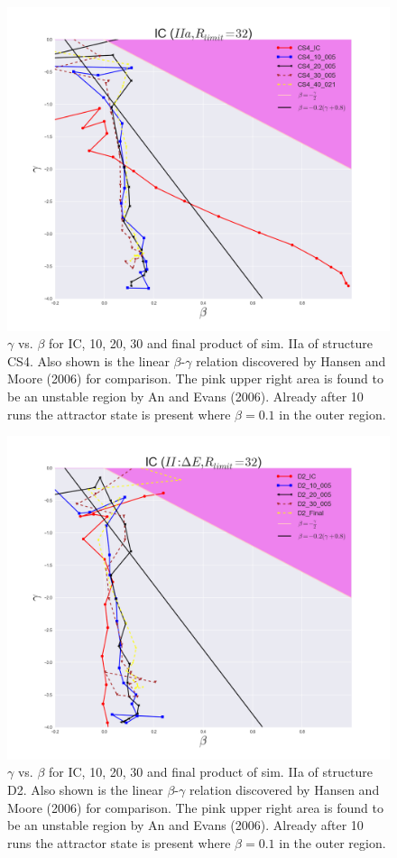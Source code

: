 \begin{figure}[!htbp]
\centering
\includegraphics[width=1.0\linewidth]{img/beta_vs_gamma_CS4_Time_evolution_Rlimit32_IIa.png}
\caption{$\gamma$ vs. $\beta$ for IC, 10, 20, 30 and final product of sim. IIa of structure CS4. Also shown is the linear $\beta$-$\gamma$ relation discovered by Hansen and Moore (2006) for comparison. The pink upper right area is found to be an unstable region by An and Evans (2006).
Already after 10 runs the attractor state is present where $\beta = 0.1$ in the outer region.}
\label{fig:test}
\end{figure}

\begin{figure}[!htbp]
\centering
\includegraphics[width=1.0\linewidth]{img/beta_vs_gamma_D2_Time_evolution_Rlimit32.png}
\caption{$\gamma$ vs. $\beta$ for IC, 10, 20, 30 and final product of sim. IIa of structure D2. Also shown is the linear $\beta$-$\gamma$ relation discovered by Hansen and Moore (2006) for comparison. The pink upper right area is found to be an unstable region by An and Evans (2006).
Already after 10 runs the attractor state is present where $\beta = 0.1$ in the outer region.}
\label{fig:test}
\end{figure}

